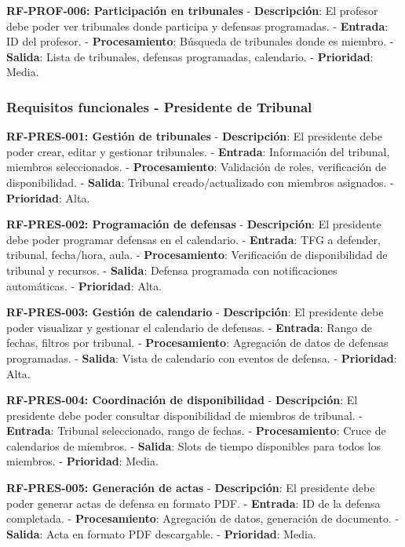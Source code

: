 \documentclass[12pt,a4paper,oneside]{report}
\begin{document}
\textbf{RF-PROF-006: Participación en tribunales} -
\textbf{Descripción}: El profesor debe poder ver tribunales donde
participa y defensas programadas. - \textbf{Entrada}: ID del profesor. -
\textbf{Procesamiento}: Búsqueda de tribunales donde es miembro. -
\textbf{Salida}: Lista de tribunales, defensas programadas, calendario.
- \textbf{Prioridad}: Media.

\subsubsection{Requisitos funcionales - Presidente de
Tribunal}\label{requisitos-funcionales---presidente-de-tribunal}

\textbf{RF-PRES-001: Gestión de tribunales} - \textbf{Descripción}: El
presidente debe poder crear, editar y gestionar tribunales. -
\textbf{Entrada}: Información del tribunal, miembros seleccionados. -
\textbf{Procesamiento}: Validación de roles, verificación de
disponibilidad. - \textbf{Salida}: Tribunal creado/actualizado con
miembros asignados. - \textbf{Prioridad}: Alta.

\textbf{RF-PRES-002: Programación de defensas} - \textbf{Descripción}:
El presidente debe poder programar defensas en el calendario. -
\textbf{Entrada}: TFG a defender, tribunal, fecha/hora, aula. -
\textbf{Procesamiento}: Verificación de disponibilidad de tribunal y
recursos. - \textbf{Salida}: Defensa programada con notificaciones
automáticas. - \textbf{Prioridad}: Alta.

\textbf{RF-PRES-003: Gestión de calendario} - \textbf{Descripción}: El
presidente debe poder visualizar y gestionar el calendario de defensas.
- \textbf{Entrada}: Rango de fechas, filtros por tribunal. -
\textbf{Procesamiento}: Agregación de datos de defensas programadas. -
\textbf{Salida}: Vista de calendario con eventos de defensa. -
\textbf{Prioridad}: Alta.

\textbf{RF-PRES-004: Coordinación de disponibilidad} -
\textbf{Descripción}: El presidente debe poder consultar disponibilidad
de miembros de tribunal. - \textbf{Entrada}: Tribunal seleccionado,
rango de fechas. - \textbf{Procesamiento}: Cruce de calendarios de
miembros. - \textbf{Salida}: Slots de tiempo disponibles para todos los
miembros. - \textbf{Prioridad}: Media.

\textbf{RF-PRES-005: Generación de actas} - \textbf{Descripción}: El
presidente debe poder generar actas de defensa en formato PDF. -
\textbf{Entrada}: ID de la defensa completada. - \textbf{Procesamiento}:
Agregación de datos, generación de documento. - \textbf{Salida}: Acta en
formato PDF descargable. - \textbf{Prioridad}: Media.
\end{document}
